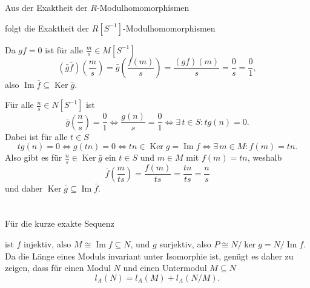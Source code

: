 \documentclass[a4paper,10pt]{article}
\theoremstyle{definition}
\newcommand{\Img}{\operatorname{Im}}
\newcommand{\Ker}{\operatorname{Ker}}
\begin{document}
Aus der Exaktheit der $R$-Modulhomomorphismen
\begin{center}
\end{center}
folgt die Exaktheit der $R[S^{-1}]$-Modulhomomorphismen
\begin{center}
\end{center}

Da $gf = 0$ ist für alle $\frac{m}{s} \in M[S^{-1}]$
\[
 (\bar{g} \bar{f})\left( \frac{m}{s} \right)
 = \bar{g}\left( \frac{f(m)}{s} \right)
 = \frac{(gf)(m)}{s}
 = \frac{0}{s}
 = \frac{0}{1},
\]
also $\Img \bar{f} \subseteq \Ker \bar{g}$.

Für alle $\frac{n}{s} \in N[S^{-1}]$ ist
\[
 \bar{g}\left(\frac{n}{s}\right) = \frac{0}{1}
 \Leftrightarrow \frac{g(n)}{s} = \frac{0}{1}
 \Leftrightarrow \exists\, t \in S : tg(n) = 0.
\]
Dabei ist für alle $t \in S$
\[
 tg(n) = 0 
 \Leftrightarrow g(tn) = 0
 \Leftrightarrow tn \in \Ker g = \Img f
 \Leftrightarrow \exists\, m \in M : f(m) = tn.
\]
Also gibt es für $\frac{n}{s} \in \Ker \bar{g}$ ein $t \in S$ und $m \in M$ mit $f(m) = tn$, weshalb
\[
 \bar{f}\left( \frac{m}{ts} \right)
 = \frac{f(m)}{ts}
 = \frac{tn}{ts}
 = \frac{n}{s}
\]
und daher $\Ker \bar{g} \subseteq \Img \bar{f}$.





\section{}
Für die kurze exakte Sequenz
\begin{center}
\end{center}
ist $f$ injektiv, also $M \cong \Img f \subseteq N$, und $g$ surjektiv, also $P \cong N / \ker g = N / \Img f$. Da die Länge eines Moduls invariant unter Isomorphie ist, genügt es daher zu zeigen, dass für einen Modul $N$ und einen Untermodul $M \subseteq N$
\[
 l_A(N) = l_A(M) + l_A(N/M).
\]
\end{document}
